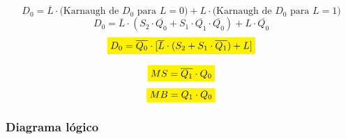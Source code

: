 \[
	D_0 = \overline{L}\cdot{}\text{(Karnaugh de $D_0$ para $L=0$)} + L\cdot{}\text{(Karnaugh de $D_0$ para $L=1$)}
\]
\[
	D_0 = \overline{L}\cdot{}(S_2\cdot\overline{Q_0} + S_1\cdot\overline{Q_1}\cdot\overline{Q_0}) + L\cdot{}\overline{Q_0}
\]
\[
	\colorbox{yellow}{$D_0 = \overline{Q_0}\cdot{}[\overline{L}\cdot{}(S_2 + S_1\cdot\overline{Q_1})+L]$}
\]

\[
	\colorbox{yellow}{$MS = \overline{Q_1}\cdot{}Q_0$}
\]
\[
	\colorbox{yellow}{$MB = Q_1\cdot{}Q_0$}
\]

\subsubsection{Diagrama lógico}

